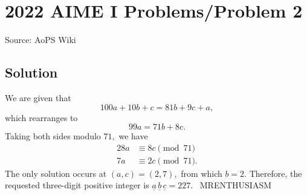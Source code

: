 \documentclass[12pt]{article}
\begin{document}
\section*{{2022 AIME I Problems/Problem 2}}
Source: AoPS Wiki

\subsection*{Solution}
We are given that \[100a + 10b + c = 81b + 9c + a,\] which rearranges to \[99a = 71b + 8c.\] Taking both sides modulo $71,$ we have \begin{align*} 28a &\equiv 8c \pmod{71} \\ 7a &\equiv 2c \pmod{71}. \end{align*} The only solution occurs at $(a,c)=(2,7),$ from which $b=2.$ Therefore, the requested three-digit positive integer is $\underline{a}\,\underline{b}\,\underline{c}=\boxed{227}.$ ~MRENTHUSIASM
\end{document}
